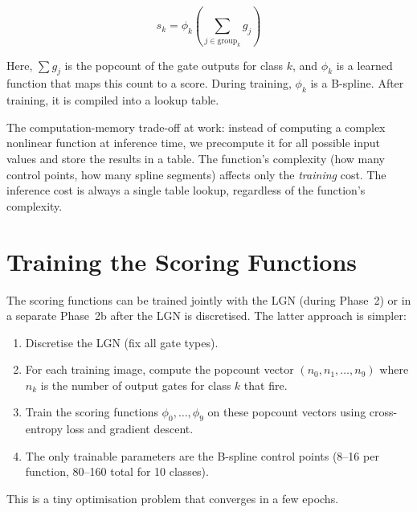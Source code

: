 \begin{equation}
  s_k = \phi_k\!\left(\sum_{j \in \text{group}_k} g_j\right)
  \label{eq:scoring}
\end{equation}

Here, $\sum g_j$ is the popcount of the gate outputs for class $k$,
and $\phi_k$ is a learned function that maps this count to a score.
During training, $\phi_k$ is a B-spline. After training, it is
compiled into a lookup table.

\begin{keyinsight}
The computation-memory trade-off at work: instead of computing a
complex nonlinear function at inference time, we precompute it for
all possible input values and store the results in a table. The
function's complexity (how many control points, how many spline
segments) affects only the \emph{training} cost. The inference cost
is always a single table lookup, regardless of the function's
complexity.
\end{keyinsight}


\section{Training the Scoring Functions}
\label{sec:scoring-training}

The scoring functions can be trained jointly with the LGN (during
Phase~2) or in a separate Phase~2b after the LGN is discretised.
The latter approach is simpler:

\begin{enumerate}
  \item Discretise the LGN (fix all gate types).
  \item For each training image, compute the popcount vector
    $(n_0, n_1, \ldots, n_9)$ where $n_k$ is the number of output
    gates for class $k$ that fire.
  \item Train the scoring functions $\phi_0, \ldots, \phi_9$ on
    these popcount vectors using cross-entropy loss and gradient
    descent.
  \item The only trainable parameters are the B-spline control points
    (8--16 per function, 80--160 total for 10 classes).
\end{enumerate}

This is a tiny optimisation problem that converges in a few epochs.


